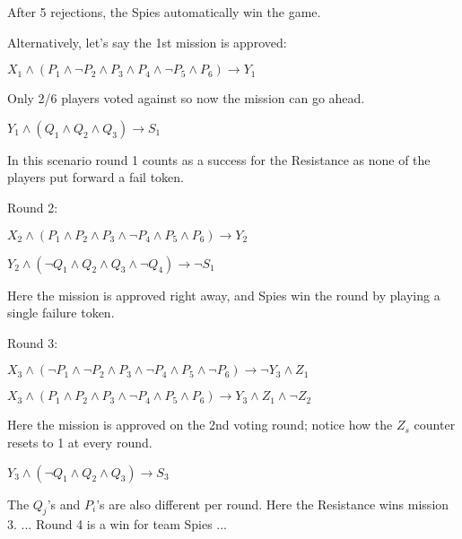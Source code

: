 \documentclass[pdftex,10pt,a4paper]{article}
\numberwithin{equation}{section} %
\begin{document}
After 5 rejections, the Spies automatically win the game. \newline

Alternatively, let's say the 1st mission is approved:

$X_1 \land ( P_1 \land \neg P_2 \land P_3 \land P_4 \land \neg P_5 \land P_6) \rightarrow Y_1 $ \newline

Only 2/6 players voted against so now the mission can go ahead. \newline

$Y_1 \land ( Q_1 \land Q_2 \land Q_3) \rightarrow S_1 $\newline

\indent In this scenario round 1 counts as a success for the Resistance as none of the \indent players put forward a fail token.\newline

Round 2:

$X_2 \land ( P_1 \land P_2 \land P_3 \land \neg P_4 \land P_5 \land P_6) \rightarrow Y_2 $ \newline

$Y_2 \land ( \neg Q_1 \land Q_2 \land Q_3 \land \neg Q_4) \rightarrow \neg S_1 $\newline

Here the mission is approved right away, and Spies win the round by playing \indent a single failure token.\newline

Round 3:

$X_3 \land ( \neg P_1 \land \neg P_2 \land P_3 \land \neg P_4 \land P_5 \land \neg P_6) \rightarrow \neg Y_3 \land Z_1$ \newline

$X_3 \land ( P_1 \land P_2 \land P_3 \land \neg P_4 \land P_5 \land P_6) \rightarrow Y_3 \land Z_1 \land \neg Z_2$ \newline

Here the mission is approved on the 2nd voting round; notice how the $Z_s$ \indent counter resets to 1 at every round.\newline

$Y_3 \land ( \neg Q_1 \land Q_2 \land Q_3) \rightarrow  S_3 $\newline

The $Q_j$'s and $P_i$'s are also different per round. Here the Resistance wins \indent mission 3.\newline \newline
\indent...\newline
\indent Round 4 is a win for team Spies\newline
\indent...\newline
\end{document}
